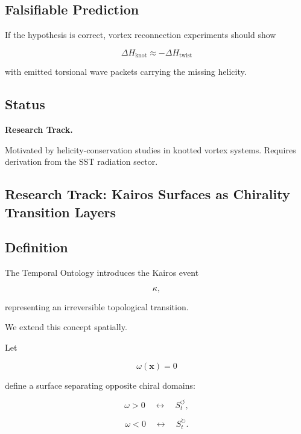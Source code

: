     \subsection{Falsifiable Prediction}
        
        If the hypothesis is correct, vortex reconnection experiments should show
        
        \[
            \Delta H_{\mathrm{knot}}
            \approx
            -
            \Delta H_{\mathrm{twist}}
        \]
        
        with emitted torsional wave packets carrying the missing helicity.
    
    \subsection{Status}
        
        \textbf{Research Track.}
        
        Motivated by helicity-conservation studies in knotted vortex systems.
        Requires derivation from the SST radiation sector.
    
    
\subsection{Research Track: Kairos Surfaces as Chirality Transition Layers}
    
    \subsection{Definition}
        
        The Temporal Ontology introduces the Kairos event
        
        \[
            \kappa,
        \]
        
        representing an irreversible topological transition.
        
        We extend this concept spatially.
        
        Let
        
        \[
            \omega(\mathbf{x})=0
        \]
        
        define a surface separating opposite chiral domains:
        
        \[
            \omega>0
            \quad\leftrightarrow\quad
            S_t^{\circlearrowleft},
        \]
        
        \[
            \omega<0
            \quad\leftrightarrow\quad
            S_t^{\circlearrowright}.
        \]
        
